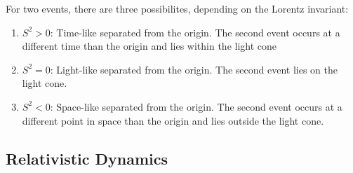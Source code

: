 \documentclass[a4paper]{article}
\begin{document}
For two events, there are three possibilites, depending on the Lorentz
invariant:
\begin{enumerate}
	\item $S^2 > 0$: Time-like separated from the origin. The second
		event occurs at a different time than the origin and lies
		within the light cone
	\item $S^2 = 0$: Light-like separated from the origin. The second
		event lies on the light cone.
	\item $S^2 < 0$: Space-like separated from the origin. The second
		event occurs at a different point in space than the origin
		and lies outside the light cone.
\end{enumerate}

\subsection{Relativistic Dynamics}
\end{document}
